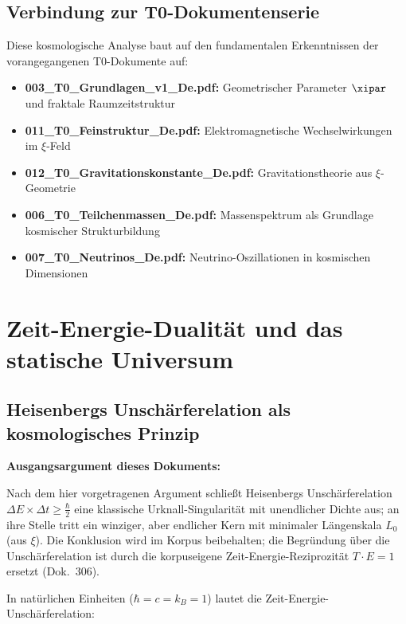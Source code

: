 	\subsection{Verbindung zur T0-Dokumentenserie}
	
	Diese kosmologische Analyse baut auf den fundamentalen Erkenntnissen der vorangegangenen T0-Dokumente auf:
	
	\begin{itemize}
		\item \textbf{003\_T0\_Grundlagen\_v1\_De.pdf:} Geometrischer Parameter $\xipar$ und fraktale Raumzeitstruktur
		\item \textbf{011\_T0\_Feinstruktur\_De.pdf:} Elektromagnetische Wechselwirkungen im $\xi$-Feld
		\item \textbf{012\_T0\_Gravitationskonstante\_De.pdf:} Gravitationstheorie aus $\xi$-Geometrie
		\item \textbf{006\_T0\_Teilchenmassen\_De.pdf:} Massenspektrum als Grundlage kosmischer Strukturbildung
		\item \textbf{007\_T0\_Neutrinos\_De.pdf:} Neutrino-Oszillationen in kosmischen Dimensionen
	\end{itemize}
	
	\section{Zeit-Energie-Dualität und das statische Universum}
	
	\subsection{Heisenbergs Unschärferelation als kosmologisches Prinzip}
	
	\begin{revolutionary}[Kernaussage]
		\textbf{Ausgangsargument dieses Dokuments:}
		
		Nach dem hier vorgetragenen Argument schließt Heisenbergs Unschärferelation $\Delta E \times \Delta t \geq \frac{\hbar}{2}$ eine klassische Urknall-Singularität mit unendlicher Dichte aus; an ihre Stelle tritt ein winziger, aber endlicher Kern mit minimaler Längenskala $L_0$ (aus $\xi$). Die Konklusion wird im Korpus beibehalten; die Begründung über die Unschärferelation ist durch die korpuseigene Zeit-Energie-Reziprozität $T\cdot E = 1$ ersetzt (Dok.~306).
	\end{revolutionary}
	
	In natürlichen Einheiten ($\hbar = c = k_B = 1$) lautet die Zeit-Energie-Unschärferelation:
	
